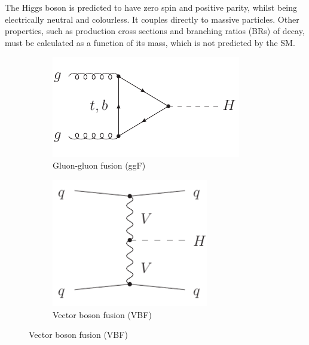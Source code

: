 
The Higgs boson is predicted to have zero spin and positive parity, whilst being 
electrically neutral and colourless. It couples directly to massive particles. Other 
properties, such as production cross sections and branching ratios (BRs) of decay, must be 
calculated as a function of its mass, which is not predicted by the SM.


\begin{figure}[t]
	\null\hfill
	\begin{subfigure}[b]{0.4\textwidth}
		\centering
		\includegraphics[width=\textwidth]{axodraw/ggF.pdf}
		\caption{Gluon-gluon fusion (ggF)}
		\label{fig:feyn:ggF}
	\end{subfigure}
	\hfill
	\begin{subfigure}[b]{0.4\textwidth}
		\centering
		\includegraphics[width=0.75\textwidth]{axodraw/VBF.pdf}
		\caption{Vector boson fusion (VBF)}
		\label{fig:feyn:VBF}

\end{subfigure}
\end{figure}
